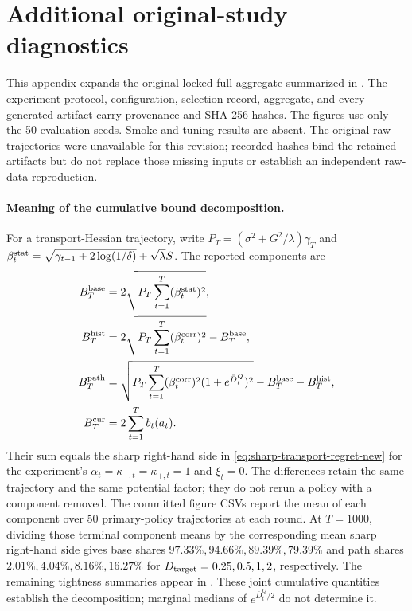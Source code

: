 \section{Additional original-study diagnostics}
\label{app:transport-instantiation}

This appendix expands the original locked full aggregate summarized in
.  The experiment protocol, configuration,
selection record, aggregate, and every generated artifact carry provenance and
SHA-256 hashes.  The figures use only the 50 evaluation seeds.  Smoke and tuning
results are absent.  The original raw trajectories were unavailable for this
revision; recorded hashes bind the retained artifacts but do not replace those
missing inputs or establish an independent raw-data reproduction.

\paragraph{Meaning of the cumulative bound decomposition.}
For a transport-Hessian trajectory, write
$P_T=(\sigma^2+G^2/\lambda)\gamma_T$ and
$\beta_t^{\rm stat}=\sqrt{\gamma_{t-1}+2\log(1/\delta)}+\sqrt\lambda S$.
The reported components are
\begin{align*}
 B_T^{\rm base}
 &=2\sqrt{P_T\sum_{t=1}^T(\beta_t^{\rm stat})^2},\\
 B_T^{\rm hist}
 &=2\sqrt{P_T\sum_{t=1}^T(\beta_t^{\rm corr})^2}-B_T^{\rm base},\\
 B_T^{\rm path}
 &=\sqrt{P_T\sum_{t=1}^T(\beta_t^{\rm corr})^2
       (1+e^{\bar D_t^Q})^2}-B_T^{\rm base}-B_T^{\rm hist},\\
 B_T^{\rm cur}&=2\sum_{t=1}^Tb_t(a_t).
\end{align*}
Their sum equals the sharp right-hand side in
\eqref{eq:sharp-transport-regret-new} for the experiment's
$\alpha_t=\kappa_{-,t}=\kappa_{+,t}=1$ and $\xi_t=0$.
The differences retain the same trajectory and the same potential factor;
they do not rerun a policy with a component removed.  The committed figure
CSVs report the mean of each component over 50 primary-policy trajectories
at each round.  At $T=1000$, dividing those terminal component means by the
corresponding mean sharp right-hand side gives base shares
$97.33\%,94.66\%,89.39\%,79.39\%$ and path shares
$2.01\%,4.04\%,8.16\%,16.27\%$ for
$D_{\rm target}=0.25,0.5,1,2$, respectively.
The remaining tightness summaries appear in
.
These joint cumulative quantities establish the decomposition;
marginal medians of $e^{\bar D_t^Q/2}$ do not determine it.

